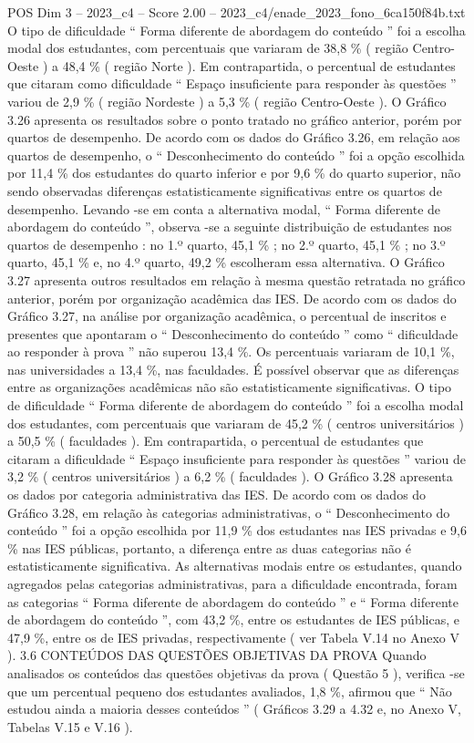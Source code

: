 \begin{textsample}{POS Dim 3 – 2023\_c4 – Score 2.00 – 2023\_c4/enade\_2023\_fono\_6ca150f84b.txt}
O tipo de dificuldade “ Forma diferente de abordagem do conteúdo ” foi a escolha modal dos estudantes, com percentuais que variaram de 38,8 \% ( região Centro-Oeste ) a 48,4 \% ( região Norte ).
Em contrapartida, o percentual de estudantes que citaram como dificuldade “ Espaço insuficiente para responder às questões ” variou de 2,9 \% ( região Nordeste ) a 5,3 \% ( região Centro-Oeste ).
O Gráfico 3.26 apresenta os resultados sobre o ponto tratado no gráfico anterior, porém por quartos de desempenho.
De acordo com os dados do Gráfico 3.26, em relação aos quartos de desempenho, o “ Desconhecimento do conteúdo ” foi a opção escolhida por 11,4 \% dos estudantes do quarto inferior e por 9,6 \% do quarto superior, não sendo observadas diferenças estatisticamente significativas entre os quartos de desempenho.
Levando -se em conta a alternativa modal, “ Forma diferente de abordagem do conteúdo ”, observa -se a seguinte distribuição de estudantes nos quartos de desempenho : no 1.º quarto, 45,1 \% ; no 2.º quarto, 45,1 \% ; no 3.º quarto, 45,1 \% e, no 4.º quarto, 49,2 \% escolheram essa alternativa.
O Gráfico 3.27 apresenta outros resultados em relação à mesma questão retratada no gráfico anterior, porém por organização acadêmica das IES.
De acordo com os dados do Gráfico 3.27, na análise por organização acadêmica, o percentual de inscritos e presentes que apontaram o “ Desconhecimento do conteúdo ” como “ dificuldade ao responder à prova ” não superou 13,4 \%.
Os percentuais variaram de 10,1 \%, nas universidades a 13,4 \%, nas faculdades.
É possível observar que as diferenças entre as organizações acadêmicas não são estatisticamente significativas.
O tipo de dificuldade “ Forma diferente de abordagem do conteúdo ” foi a escolha modal dos estudantes, com percentuais que variaram de 45,2 \% ( centros universitários ) a 50,5 \% ( faculdades ).
Em contrapartida, o percentual de estudantes que citaram a dificuldade “ Espaço insuficiente para responder às questões ” variou de 3,2 \% ( centros universitários ) a 6,2 \% ( faculdades ).
O Gráfico 3.28 apresenta os dados por categoria administrativa das IES.
De acordo com os dados do Gráfico 3.28, em relação às categorias administrativas, o “ Desconhecimento do conteúdo ” foi a opção escolhida por 11,9 \% dos estudantes nas IES privadas e 9,6 \% nas IES públicas, portanto, a diferença entre as duas categorias não é estatisticamente significativa.
As alternativas modais entre os estudantes, quando agregados pelas categorias administrativas, para a dificuldade encontrada, foram as categorias “ Forma diferente de abordagem do conteúdo ” e “ Forma diferente de abordagem do conteúdo ”, com 43,2 \%, entre os estudantes de IES públicas, e 47,9 \%, entre os de IES privadas, respectivamente ( ver Tabela V.14 no Anexo V ). 3.6 CONTEÚDOS DAS QUESTÕES OBJETIVAS DA PROVA Quando analisados os conteúdos das questões objetivas da prova ( Questão 5 ), verifica -se que um percentual pequeno dos estudantes avaliados, 1,8 \%, afirmou que “ Não estudou ainda a maioria desses conteúdos ” ( Gráficos 3.29 a 4.32 e, no Anexo V, Tabelas V.15 e V.16 ).

\end{textsample}
